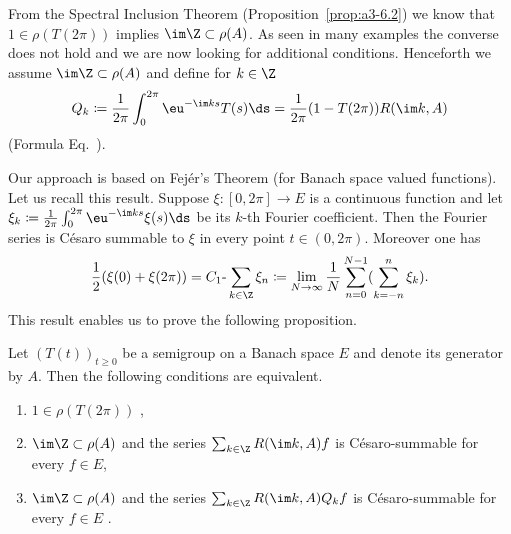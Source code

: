 From the Spectral Inclusion Theorem (Proposition~\ref{prop:a3-6.2}) we know that $1 \in \rho(T(2\pi))$ implies $\im\Z \subset \rho(A)$.
As seen in many examples the converse does not hold and we are now looking for additional conditions.
Henceforth we assume $\im\Z \subset \rho(A)$ and define for $k \in \Z$
\begin{equation}\label{eq:a3-7.7}
Q_{k}\coloneqq \frac{1}{2\pi}\int_{0}^{2\pi} \eu^{-\im ks}T(s)\ds = \frac{1}{2\pi}(1 - T(2\pi))R(\im k,A)
\end{equation}
(\cf Formula Eq.~).

Our approach is based on Fejér's Theorem (for Banach space valued functions).
Let us recall this result.
Suppose $\xi \colon [0,2\pi] \to E$ is a continuous function and let $\xi_{k}\coloneqq \frac{1}{2\pi}\int_{0}^{2\pi} \eu^{-\im ks}\xi(s)\ds$ be its $k$-th Fourier coefficient.
Then the Fourier series is Césaro summable to $\xi$ in every point $t \in (0,2\pi)$.
Moreover one has
\begin{equation}\label{eq:a3-7.8}
\frac{1}{2}(\xi(0) + \xi(2\pi)) = C_{1}\text{-}\sum_{k\in\Z} \xi_{n} \coloneqq \lim_{N\to\infty} \frac{1}{N}\sum_{n=0}^{N-1}(\sum_{k=-n}^{n} \xi_{k}) .
\end{equation}
This result enables us to prove the following proposition.
\begin{proposition}\label{prop:a3-7.8}
%
Let $(T(t))_{t\geq 0}$ be a semigroup on a Banach space $E$ and denote its generator by $A$.
Then the following conditions are equivalent.
\begin{enumerate}[\upshape (a)]

\item $1 \in \rho(T(2\pi))$ ,

\item 
$\im\Z \subset \rho(A)$ and the series $\sum_{k\in\Z} R(\im k,A)f$ is Césaro-summable for every $f \in E$,

\item 
$\im\Z \subset \rho(A)$ and the series $\sum_{k\in\Z} R(\im k,A)Q_{k}f$ is Césaro-summable for every $f \in E$ .

\end{enumerate}
\end{proposition}
